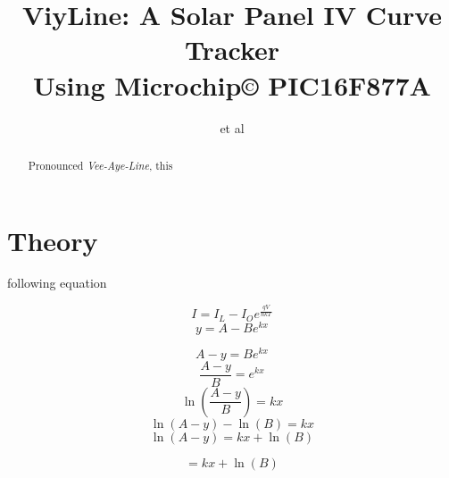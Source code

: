 \documentclass[journal,a4paper]{IEEEtran}
\begin{document}
    \title{
        ViyLine: A Solar Panel IV Curve Tracker
        \\ {\Large Using Microchip© PIC16F877A}
    }

    \author{et al}
    \maketitle

    \begin{abstract}
        Pronounced \emph{Vee-Aye-Line}, this
    \end{abstract}

    \section{Theory}
         following equation

        $$I = I_L - I_O e^{\frac{qV}{nkT}}$$
        $$y = A - B e^{kx}$$



        $$A - y = B e^{kx}$$
        $$\frac{A - y}{B} = e^{kx}$$
        $$\ln \left( \frac{A - y}{B} \right) = kx$$
        $$\ln(A - y) - \ln(B) = kx$$
        $$\ln(A - y) = kx + \ln(B)$$

        $$ = kx + \ln(B)$$





\end{document}
